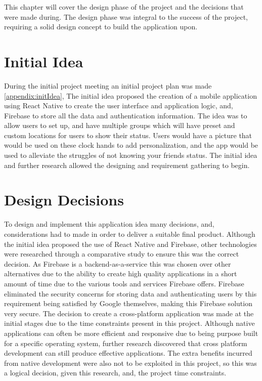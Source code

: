 This chapter will cover the design phase of the project and the decisions  that were made during. The design phase was integral to the success of the project, requiring a solid design concept to build the application upon.

\section{Initial Idea}
During the initial project meeting an initial project plan was made \ref{appendix:initIdea}, The initial idea proposed the creation of a mobile application using React Native \cite{reactnative} to create the user interface and application logic, and, Firebase \cite{firebase} to store all the data and authentication information. The idea was to allow users to set up, and have multiple groups which will have preset and custom locations for users to show their status. Users would have a picture that would be used on these clock hands to add personalization, and the app would be used to alleviate the struggles of not knowing your friends status. The initial idea and further research allowed the designing and requirement gathering to begin.

\section{Design Decisions}\label{designDecis}
To design and implement this application idea many decisions, and, considerations had to made in order to deliver a suitable final product. Although the initial idea proposed the use of React Native and Firebase, other technologies were researched through a comparative study \cite{compStudy} to ensure this was the correct decision. As Firebase is a backend-as-a-service this was chosen over other alternatives due to the ability to create high quality applications in a short amount of time due to the various tools and services Firebase offers. Firebase eliminated the security concerns for storing data and authenticating  users by this requirement being satisfied by Google themselves, making this Firebase solution very secure. The decision to create a cross-platform application was made at the initial stages due to the time constraints present in this project. Although native applications can often be more efficient and responsive due to being purpose built for a specific operating system, further research discovered that cross platform development can still produce effective applications. The extra benefits incurred from native development were also not to be exploited in this project, so this was a logical decision, given this research, and, the project time constraints.

